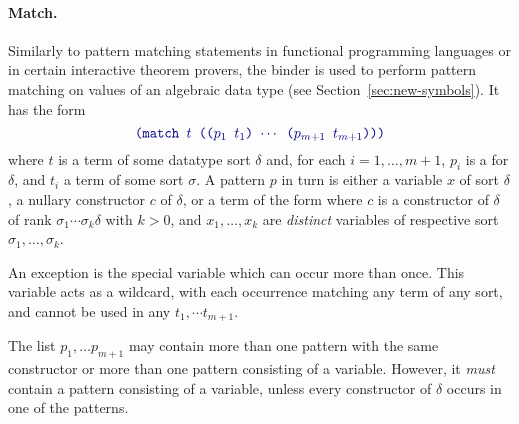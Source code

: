 \paragraph{Match.}
Similarly to pattern matching statements in functional programming languages
or in certain interactive theorem provers,
the  binder is used to perform pattern matching on values 
of an algebraic data type (see Section~\ref{sec:new-symbols}).
It has the form
%
\begin{equation} \label{eq:match}
\expr{(match $t$ (($p_1$ $t_1$) $\cdots$ ($p_{m+1}$ $t_{m+1}$)))}
\end{equation}
%
where $t$ is a term of some datatype sort $\delta$ and,
for each $i=1,\ldots,m+1$,
$p_i$ is a  for $\delta$, and $t_i$ a term of some sort $\sigma$.
A pattern $p$ in turn is either a variable $x$ of sort $\delta$, 
a nullary constructor $c$ of $\delta$, 
or a term of the form 
where $c$ is a constructor of $\delta$ of rank
$\sigma_1\cdots\sigma_k\delta$ 
with $k > 0$, and $x_1, \ldots, x_k$ are \emph{distinct} variables 
of respective sort $\sigma_1,\ldots,\sigma_k$.
\begin{newver}
An exception is the special variable \ter{\_} which can occur
more than once.  This variable acts as a wildcard, with each occurrence
matching any term of any sort, and cannot be used in
any $t_1, \cdots t_{m + 1}$.
\end{newver}

The list $p_1,\ldots p_{m+1}$ may contain more than one pattern with the same constructor 
or more than one pattern consisting of a variable.
However, it \emph{must} contain a pattern consisting of a variable, 
unless every constructor of $\delta$ occurs in one of the patterns.



